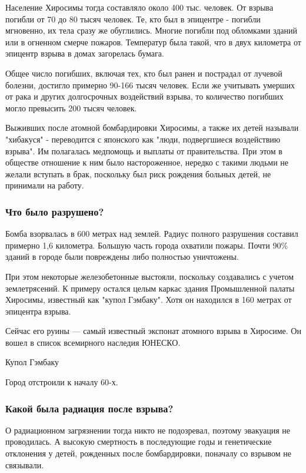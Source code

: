 Население Хиросимы тогда составляло около 400 тыс. человек. От взрыва погибли
от 70 до 80 тысяч человек. Те, кто был в эпицентре - погибли мгновенно, их тела
сразу же обуглились. Многие погибли под обломками зданий или в огненном смерче
пожаров. Температур была такой, что в двух километра от эпицентр взрыва в домах
загорелась бумага.

Общее число погибших, включая тех, кто был ранен и пострадал от лучевой
болезни, достигло примерно 90-166 тысяч человек. Если же учитывать умерших от
рака и других долгосрочных воздействий взрыва, то количество погибших могло
превысить 200 тысяч человек.

Выживших после атомной бомбардировки Хиросимы, а также их детей называли
"хибакуся" -  переводится с японского как "люди, подвергшиеся воздействию
взрыва". Им полагалась медпомощь и выплаты от правительства. При этом в
обществе отношение к ним было настороженное, нередко с такими людьми не желали
вступать в брак, поскольку был риск рождения больных детей, не принимали на
работу.

\subsubsection{Что было разрушено?}

Бомба взорвалась в 600 метрах над землей. Радиус полного разрушения составил
примерно 1,6 километра. Большую часть города охватили пожары. Почти 90\% зданий
в городе были повреждены либо полностью уничтожены.

При этом некоторые железобетонные выстояли, поскольку создавались с учетом
землетрясений. К примеру остался целым каркас здания Промышленной палаты
Хиросимы, известный как "купол Гэмбаку". Хотя он находился в 160 метрах от
эпицентра взрыва.

Сейчас его руины --- самый известный экспонат атомного взрыва в Хиросиме. Он
вошел в список всемирного наследия ЮНЕСКО.

Купол Гэмбаку

Город отстроили к началу 60-х.

\subsubsection{Какой была радиация после взрыва?}

О радиационном загрязнении тогда никто не подозревал, поэтому эвакуация не
проводилась. А высокую смертность в последующие годы и генетические отклонения
у детей, рожденных после бомбардировки, поначалу со взрывом не связывали.


